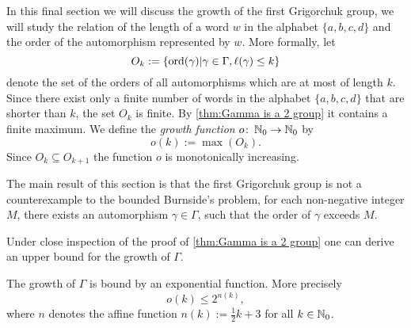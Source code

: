 In this final section we will discuss the growth of the first Grigorchuk group, \ie we will study the relation of the length of a word $w$ in the alphabet $\lbrace a,b,c,d\rbrace$ and the order of the automorphism represented by $w$. More formally, let
\begin{equation*}
O_k:=\lbrace \operatorname{\mathrm{ord}}(\gamma)\vert\gamma\in\Gamma,\ell(\gamma)\leq k\rbrace
\end{equation*}
denote the set of the orders of all automorphisms which are at most of length $k$. Since there exist only a finite number of  words in the alphabet $\lbrace a,b,c,d\rbrace$ that are shorter than $k$, the set $O_k$ is finite. By \cref{thm:Gamma is a 2 group} it contains a  finite maximum.  We define the \emph{growth function} $o\colon \operatorname{\mathbb{N}}_0\to\operatorname{\mathbb{N}}_0$ by 
\begin{equation*}
o(k):=\max(O_k).
\end{equation*}
Since $O_k\subseteq O_{k+1}$ the function $o$ is monotonically increasing.

The main result of this section is that the first Grigorchuk group is not a counterexample to the bounded Burnside's problem, \ie for each non-negative integer $M$, there exists an automorphism $\gamma\in\Gamma$, such that the order of $\gamma$ exceeds $M$.

Under close inspection of the proof of \cref{thm:Gamma is a 2 group} one can derive an upper bound for the growth of $\Gamma$.
\begin{cor}\label{thm:Upper bound for the growth of Gamma}
The growth of $\Gamma$ is bound by an exponential function. More precisely
\begin{equation}\label{eq:Upper bound for the growth of Gamma}
o(k)\leq 2^{n(k)},
\end{equation}
where $n$ denotes the affine function $n(k):=\frac{1}{2}k+3$ for all $k\in\operatorname{\mathbb{N}}_0$.
\end{cor}

